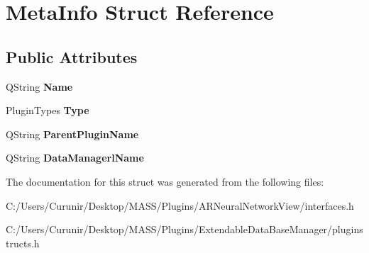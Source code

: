 \hypertarget{struct_meta_info}{}\section{Meta\+Info Struct Reference}
\label{struct_meta_info}
\subsection*{Public Attributes}
\begin{DoxyCompactItemize}
\item 
\mbox{\label{struct_meta_info_a5a2f44643b5406699d1fb9ef742ab331}} 
Q\+String {\bfseries Name}
\item 
\mbox{\label{struct_meta_info_aaaf1d51db4890bb4f5cbb08ea15b5940}} 
Plugin\+Types {\bfseries Type}
\item 
\mbox{\label{struct_meta_info_a01ddb956e9390d748f8d3812521d17ff}} 
Q\+String {\bfseries Parent\+Plugin\+Name}
\item 
\mbox{\label{struct_meta_info_aa2b9d929a6ef2956c60d4bb029371669}} 
Q\+String {\bfseries Data\+Managerl\+Name}
\end{DoxyCompactItemize}


The documentation for this struct was generated from the following files\+:\begin{DoxyCompactItemize}
\item 
C\+:/\+Users/\+Curunir/\+Desktop/\+M\+A\+S\+S/\+Plugins/\+A\+R\+Neural\+Network\+View/interfaces.\+h\item 
C\+:/\+Users/\+Curunir/\+Desktop/\+M\+A\+S\+S/\+Plugins/\+Extendable\+Data\+Base\+Manager/pluginstructs.\+h\end{DoxyCompactItemize}
